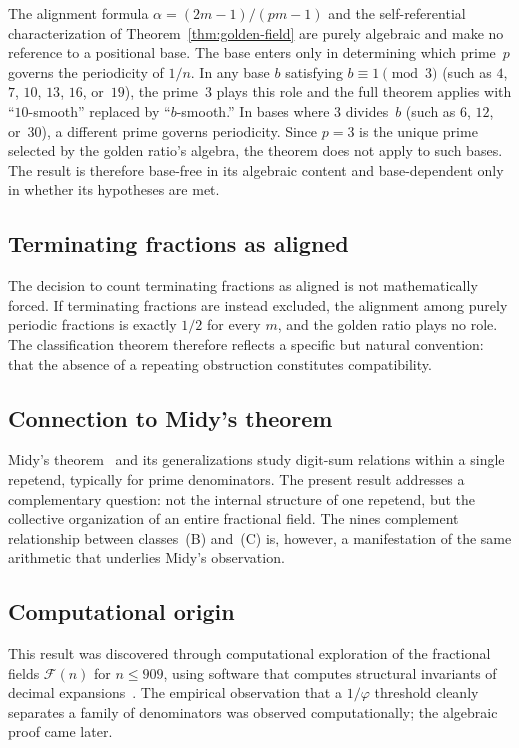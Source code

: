 \documentclass[12pt]{amsart}
\theoremstyle{definition}
\theoremstyle{remark}
\begin{document}
The alignment formula $\alpha = (2m{-}1)/(pm{-}1)$ and the
self-referential characterization of Theorem~\ref{thm:golden-field} are
purely algebraic and make no reference to a positional base. The base
enters only in determining which prime~$p$ governs the periodicity of
$1/n$. In any base $b$ satisfying $b \equiv 1 \pmod{3}$
(such as $4$, $7$, $10$, $13$, $16$, or~$19$), the
prime~$3$ plays this role and the full theorem applies with
``$10$-smooth'' replaced by ``$b$-smooth.'' In bases where $3$
divides~$b$ (such as $6$, $12$, or~$30$), a different prime governs
periodicity. Since $p = 3$ is the unique prime selected by the golden
ratio's algebra, the theorem does not apply to such bases. The result
is therefore base-free in its algebraic content and base-dependent only
in whether its hypotheses are met.

\subsection*{Terminating fractions as aligned}

The decision to count terminating fractions as aligned is not
mathematically forced. If terminating fractions are instead excluded, the
alignment among purely periodic fractions is exactly $1/2$ for every $m$,
and the golden ratio plays no role. The classification theorem therefore
reflects a specific but natural convention: that the absence of a
repeating obstruction constitutes compatibility.

\subsection*{Connection to Midy's theorem}

Midy's theorem~\cite{midy,leavitt} and its generalizations study
digit-sum relations within a single repetend, typically for prime
denominators. The present result addresses a complementary question:
not the internal structure of one repetend, but the collective
organization of an entire fractional field. The nines complement
relationship between classes~(B) and~(C) is, however, a manifestation
of the same arithmetic that underlies Midy's observation.

\subsection*{Computational origin}

This result was discovered through computational exploration of the
fractional fields $\mathcal{F}(n)$ for $n \le 909$, using software that
computes structural invariants of decimal expansions~\cite{nfield}. The
empirical observation that a $1/\varphi$ threshold cleanly separates
a family of denominators was observed computationally; the algebraic proof came later.
\end{document}
